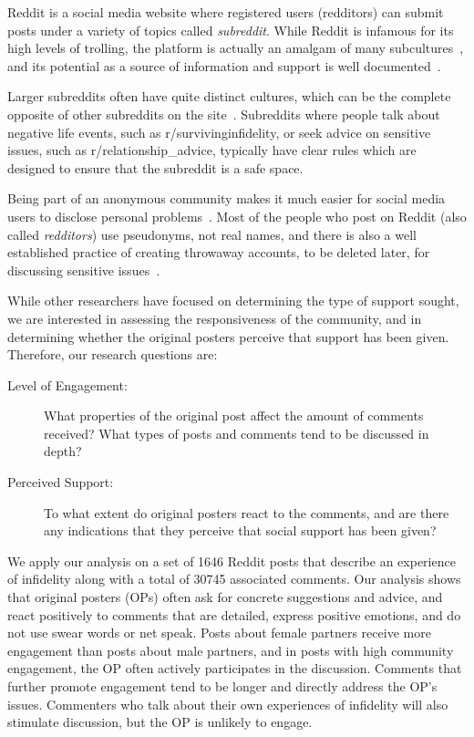 Reddit is a social media website where registered users (redditors) can submit posts under a variety of topics called \emph{subreddit}. While Reddit is infamous for its high levels of trolling, the platform is actually an amalgam of many subcultures~\cite{massanari_participatory_2015,robards_belonging_2018}, and its potential as a source of information and support is well documented~\cite{carpenter_advice_2018,de2014mental,moore_redditors_2017,Sharma2018support}.

Larger subreddits often have quite distinct cultures, which can be the complete opposite of other subreddits on the site~\cite{massanari_participatory_2015}.  Subreddits where people talk about negative life events, such as r/survivinginfidelity, or seek advice on sensitive issues, such as r/relationship\_advice, typically have clear rules which are designed to ensure that the subreddit is a safe space. 

Being part of an anonymous community makes it much easier for social media users to disclose personal problems~\cite{ma_anonymity_2016}. Most of the people who post on Reddit (also called \emph{redditors}) use pseudonyms, not real names, and there is also a well established practice of creating throwaway accounts, to be deleted later, for discussing sensitive issues~\cite{leavitt_throwaway_2015}.

While other researchers have focused on determining the type of support sought, we are interested in assessing the responsiveness of the community, and in determining whether the original posters perceive that support has been given. Therefore, our research questions are: 
\begin{description}
  \item[Level of Engagement:] What properties of the original post affect the amount of comments received? What types of posts and comments tend to be discussed in depth? 
  \item[Perceived Support:] To what extent do original posters react to the comments, and are there any indications that they perceive that social support has been given?
\end{description}

We apply our analysis on a set of 1646 Reddit posts that describe an experience of infidelity along with a total of 30745 associated comments. Our analysis shows that original posters (OPs) often ask for concrete suggestions and advice, and react positively to comments that are detailed, express positive emotions, and do not use swear words or net speak. Posts about female partners receive more engagement than posts about male partners, and in posts with high community engagement, 
the OP often actively participates in the discussion. Comments that further promote engagement tend to be longer and directly address the OP's issues. 
Commenters who talk about their own experiences of infidelity will also stimulate discussion, but the OP is unlikely to engage. 

